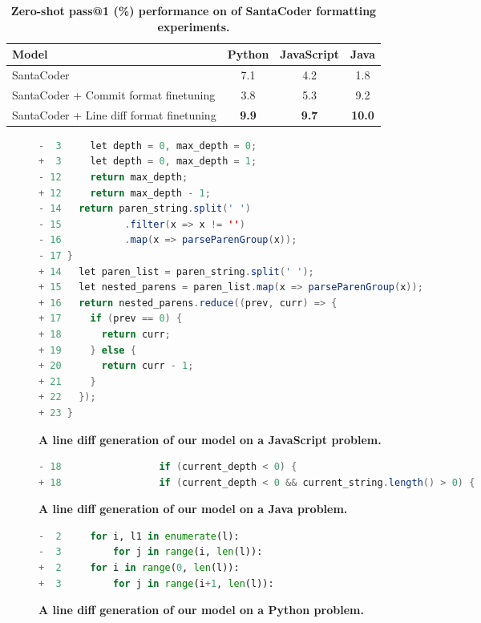 \begin{table*}[htbp]
    \centering
\begin{tabular}{l|ccc}
    \toprule
    \textbf{Model} & \textbf{Python} & \textbf{JavaScript} & \textbf{Java} \\
    \midrule
    SantaCoder & 7.1 & 4.2 & 1.8 \\
    SantaCoder + Commit format finetuning & 3.8 & 5.3 & 9.2 \\
    SantaCoder + Line diff format finetuning & \textbf{9.9} & \textbf{9.7} & \textbf{10.0} \\
    \bottomrule
    \end{tabular}
\caption{
        \textbf{Zero-shot pass@1 (\%) performance on \evalf{} of SantaCoder formatting experiments.}
    }
    \label{tab:santacodercommit}
\end{table*}

\begin{figure}[htbp]
\centering
\begin{lstlisting}[language=Java,breaklines=true,basicstyle=\ttfamily\scriptsize]
-  3     let depth = 0, max_depth = 0;
+  3     let depth = 0, max_depth = 1;
- 12     return max_depth;
+ 12     return max_depth - 1;
- 14   return paren_string.split(' ')
- 15           .filter(x => x != '')
- 16           .map(x => parseParenGroup(x));
- 17 }
+ 14   let paren_list = paren_string.split(' ');
+ 15   let nested_parens = paren_list.map(x => parseParenGroup(x));
+ 16   return nested_parens.reduce((prev, curr) => {
+ 17     if (prev == 0) {
+ 18       return curr;
+ 19     } else {
+ 20       return curr - 1;
+ 21     }
+ 22   });
+ 23 }
\end{lstlisting}
\caption{\textbf{A line diff generation of our model on a JavaScript \evalf{} problem.}}
\label{fig:jsexample_linediff}
\end{figure}

\begin{figure}[htbp]
\centering
\begin{lstlisting}[language=Java,breaklines=true,basicstyle=\ttfamily\scriptsize]
- 18                 if (current_depth < 0) {
+ 18                 if (current_depth < 0 && current_string.length() > 0) {
\end{lstlisting}
\caption{\textbf{A line diff generation of our model on a Java \evalf{} problem.}}
\label{fig:javaexample_linediff}
\end{figure}

\begin{figure}[htbp]
\centering
\begin{lstlisting}[language=Python,breaklines=true,basicstyle=\ttfamily\scriptsize]
-  2     for i, l1 in enumerate(l):
-  3         for j in range(i, len(l)):
+  2     for i in range(0, len(l)):
+  3         for j in range(i+1, len(l)):\end{lstlisting}
\caption{\textbf{A line diff generation of our model on a Python \evalf{} problem.}}
\label{fig:pyexample_linediff}
\end{figure}

